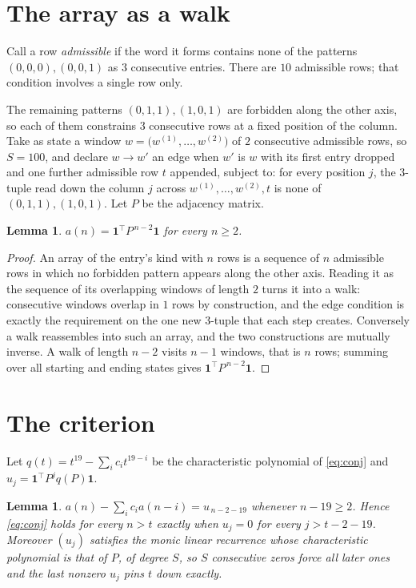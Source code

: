 \documentclass[11pt,a4paper]{article}
\theoremstyle{plain}
\newtheorem{lemma}[theorem]{Lemma}
\theoremstyle{definition}
\begin{document}
\section{The array as a walk}

Call a row \emph{admissible} if the word it forms contains none of the patterns
$(0,0,0), (0,0,1)$ as $3$ consecutive entries. There are $10$ admissible rows; that condition
involves a single row only.

The remaining patterns $(0,1,1), (1,0,1)$ are forbidden along the other axis, so each of them
constrains $3$ consecutive rows at a fixed position of the column. Take as state a
window $w=\bigl(w^{(1)},\dots,w^{(2)}\bigr)$ of $2$ consecutive admissible
rows, so $S=100$, and declare $w\to w'$ an edge when $w'$ is $w$ with its first entry
dropped and one further admissible row $t$ appended, subject to: for every position
$j$, the $3$-tuple read down the column $j$ across $w^{(1)},\dots,w^{(2)},t$
is none of $(0,1,1), (1,0,1)$. Let $P$ be the adjacency matrix.

\begin{lemma}\label{lem:walk}
$a(n)=\mathbf{1}^{\!\top}P^{\,n-2}\mathbf{1}$ for every $n\ge2$.
\end{lemma}

\begin{proof}
An array of the entry's kind with $n$ rows is a sequence of $n$ admissible rows in
which no forbidden pattern appears along the other axis. Reading it as the sequence of its
overlapping windows of length $2$ turns it into a walk: consecutive windows overlap in
$1$ rows by construction, and the edge condition is exactly the requirement on the one
new $3$-tuple that each step creates. Conversely a walk reassembles into such an array,
and the two constructions are mutually inverse. A walk of length $n-2$ visits $n-1$
windows, that is $n$ rows; summing over all starting and ending states gives
$\mathbf{1}^{\!\top}P^{\,n-2}\mathbf{1}$.
\end{proof}

\section{The criterion}

Let $q(t)=t^{19}-\sum_i c_i t^{19-i}$ be the characteristic polynomial of
\eqref{eq:conj} and $u_j=\mathbf{1}^{\!\top}P^{j}q(P)\mathbf{1}$.

\begin{lemma}\label{lem:crit}
$a(n)-\sum_i c_i a(n-i)=u_{\,n-2-19}$ whenever $n-19\ge2$. Hence
\eqref{eq:conj} holds for every $n>t$ exactly when $u_j=0$ for every
$j>t-2-19$. Moreover $(u_j)$ satisfies the monic linear recurrence whose
characteristic polynomial is that of $P$, of degree $S$, so $S$ consecutive zeros force all
later ones and the last nonzero $u_j$ pins $t$ down exactly.
\end{lemma}
\end{document}

